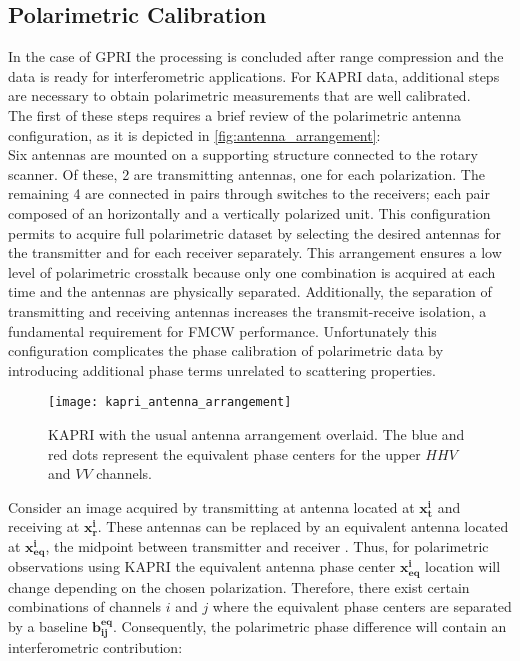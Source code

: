 \subsection{Polarimetric Calibration}\label{sec:proc_polcal}
In the case of GPRI the processing is concluded after range compression and the data is ready for interferometric applications.  For KAPRI data, additional steps are necessary to obtain polarimetric measurements that are well calibrated.\\ The first of these steps requires a brief review of the polarimetric antenna configuration, as it is depicted in \autoref{fig:antenna_arrangement}:\\ Six antennas are mounted on a supporting structure connected to the rotary scanner. Of these, 2 are transmitting antennas, one for each polarization. The remaining 4 are connected in pairs through switches to the receivers; each pair composed of an horizontally and a vertically polarized unit. This configuration permits to acquire full polarimetric dataset by selecting the desired antennas for the transmitter and for each receiver separately. This arrangement ensures a low level of polarimetric crosstalk because only one combination is acquired at each time and the antennas are physically separated. Additionally, the separation of transmitting and receiving antennas increases the transmit-receive isolation, a fundamental requirement for FMCW performance\cite{Beasley1990,Stove1992, Strozzi2011}.  Unfortunately this configuration complicates the phase calibration of polarimetric data by introducing additional phase terms unrelated to scattering properties.
\begin{figure}[ht]
	\centering
	\texttt{[image: kapri\_antenna\_arrangement]}
	\caption{KAPRI with the usual antenna arrangement overlaid. The blue and red dots represent the equivalent phase centers for the upper $HHV$ and $VV$ channels.}
	\label{fig:antenna_arrangement}
\end{figure}
Consider an image acquired by transmitting at antenna located at $\mathbf{x_t^i}$ and receiving at $\mathbf{x_r^i}$. These antennas can be replaced by an equivalent antenna located at $\mathbf{x_{eq}^i}$, the midpoint between transmitter and receiver \cite{Pipia2009}. Thus, for polarimetric observations using  KAPRI the equivalent antenna phase center $\mathbf{x_{eq}^i}$ location will change depending on the chosen polarization. Therefore, there exist certain combinations of channels $i$ and $j$ where the equivalent phase centers are separated by a baseline $\mathbf{b_{ij}^{eq}}$. Consequently, the polarimetric phase difference   will contain an interferometric contribution:
